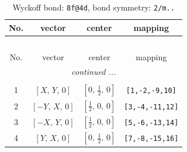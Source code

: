 \documentclass[fleqn,8pt]{jsarticle}
\begin{document}
\renewcommand{\arraystretch}{1.2}
\begin{longtable}{cccc}
\caption{Wyckoff bond: {\tt 8f@4d}, bond symmetry: {\tt 2/m..}}
 \\
 \hline \hline
No. & vector & center & mapping \\ \hline \endfirsthead

\multicolumn{3}{l}{\tablename\ \thetable{}} \\
 \hline \hline
No. & vector & center & mapping \\ \hline \endhead

 \hline \hline
\multicolumn{3}{r}{\footnotesize\it continued ...} \\ \endfoot

 \hline \hline
\multicolumn{3}{r}{} \\ \endlastfoot

1 & $\left[ X,\, Y,\, 0 \right]$ & $\left[ 0,\, \frac{1}{2},\, 0 \right]$ & {\tt [1,-2,-9,10]} \\ \hline
2 & $\left[ - Y,\, X,\, 0 \right]$ & $\left[ \frac{1}{2},\, 0,\, 0 \right]$ & {\tt [3,-4,-11,12]} \\ \hline
3 & $\left[ - X,\, Y,\, 0 \right]$ & $\left[ \frac{1}{2},\, 0,\, 0 \right]$ & {\tt [5,-6,-13,14]} \\ \hline
4 & $\left[ Y,\, X,\, 0 \right]$ & $\left[ 0,\, \frac{1}{2},\, 0 \right]$ & {\tt [7,-8,-15,16]} \\
\end{longtable}
\renewcommand{\arraystretch}{1.2}
\end{document}
